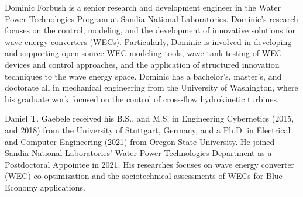 \documentclass[lettersize,journal]{IEEEtran}
\begin{document}
{\begin{IEEEbiography}{Dominic Forbush}
is a senior research and development engineer in the Water Power Technologies Program at Sandia National Laboratories.
Dominic's research focuses on the control, modeling, and the development of innovative solutions for wave energy converters (WECs).
Particularly, Dominic is involved in developing and supporting open-source WEC modeling tools, wave tank testing of WEC devices and control approaches, and the application of structured innovation techniques to the wave energy space.
Dominic has a bachelor's, master's, and doctorate all in mechanical engineering from the University of Washington, where his graduate work focused on the control of cross-flow hydrokinetic turbines.
\end{IEEEbiography}

\begin{IEEEbiography}{Daniel T. Gaebele}
received his B.S., and M.S. in Engineering Cybernetics (2015, and 2018) from the University of Stuttgart, Germany, and a Ph.D. in Electrical and Computer Engineering (2021) from Oregon State University.
He joined Sandia National Laboratories' Water Power Technologies Department as a Postdoctoral Appointee in 2021.
His researches focuses on wave energy converter (WEC) co-optimization and the sociotechnical assessments of WECs for Blue Economy applications.
\end{IEEEbiography}

}
\end{document}

